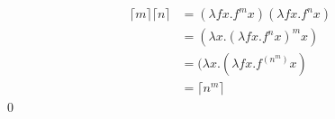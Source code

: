 \label{3.19}
\begin{pf} \rm \;
$$
\begin{aligned}
    \lceil m \rceil \lceil n \rceil
    &= (\lambda fx. f^m x)(\lambda f x.f^n x)\\
    &= (\lambda x. (\lambda fx. f^n x)^m x) \\
    &= (\lambda x. (\lambda fx. f^{(n^m)} x) \\
    &= \lceil n^m \rceil
\end{aligned}$$
    \qed 
\end{pf}